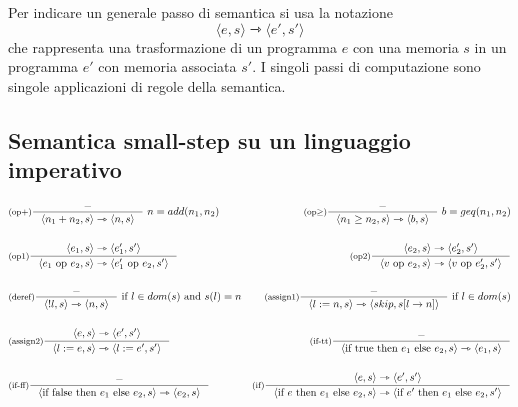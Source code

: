 \documentclass[a4paper, 11pt]{article}
\begin{document}
Per indicare un generale passo di semantica si usa la notazione \[ \langle e, s \rangle \rightarrowtriangle \langle e', s' \rangle \]
che rappresenta una trasformazione di un programma $e$ con una memoria $s$ in un programma $e'$ con memoria associata $s'$.
I singoli passi di computazione sono singole applicazioni di regole della semantica.

\subsection{Semantica small-step su un linguaggio imperativo} \label{rules}
\begin{adjustwidth}{-1.3cm}{}
\begin{align*}
	&\inference[(op+)]{-}{\langle n_1 + n_2, s \rangle \rightarrowtriangle \langle n, s \rangle}\ n = add(n_1, n_2)
	&\inference[(op$\geq$)]{-}{\langle n_1 \geq n_2, s \rangle \rightarrowtriangle \langle b, s \rangle}\ b = geq(n_1, n_2) \\
		& &\\
	&\inference[(op1)]{\langle e_1, s \rangle \rightarrowtriangle \langle e_1', s' \rangle}{\langle e_1 \text{ op } e_2, s \rangle \rightarrowtriangle \langle e_1' \text{ op } e_2, s' \rangle}  &\inference[(op2)]{\langle e_2, s \rangle \rightarrowtriangle \langle e_2', s' \rangle}{ \langle v \text{ op } e_2, s \rangle \rightarrowtriangle \langle v \text{ op } e_2', s' \rangle} \\
		& &\\
	&\inference[(deref)]{-}{\langle !l, s \rangle \rightarrowtriangle \langle n,s \rangle}\text{ if } l \in dom(s) \text{ and } s(l)=n &\inference[(assign1)]{-}{\langle l:=n,s \rangle \rightarrowtriangle \langle skip, s\lbrack l \to n\rbrack \rangle}\ \text{if } l \in dom(s) \\
		& &\\ 
	&\inference[(assign2)]{\langle e, s \rangle \rightarrowtriangle \langle e', s' \rangle}{\langle l:=e,s \rangle \rightarrowtriangle \langle l := e', s' \rangle} &\inference[(if-tt)]{-}{\langle \text{if true then } e_1 \text{ else } e_2, s \rangle \rightarrowtriangle \langle e_1, s \rangle} \\
	& & \\
	&\inference[(if-ff)]{-}{\langle \text{if false then } e_1 \text{ else } e_2, s \rangle \rightarrowtriangle \langle e_2, s \rangle} &\inference[(if)]{\langle e, s \rangle \rightarrowtriangle \langle e', s' \rangle}{\langle \text{if } e \text{ then } e_1 \text{ else } e_2, s \rangle \rightarrowtriangle \langle \text{if } e' \text{ then } e_1 \text{ else } e_2, s' \rangle} \\

\end{align*}
\end{adjustwidth}
\end{document}
